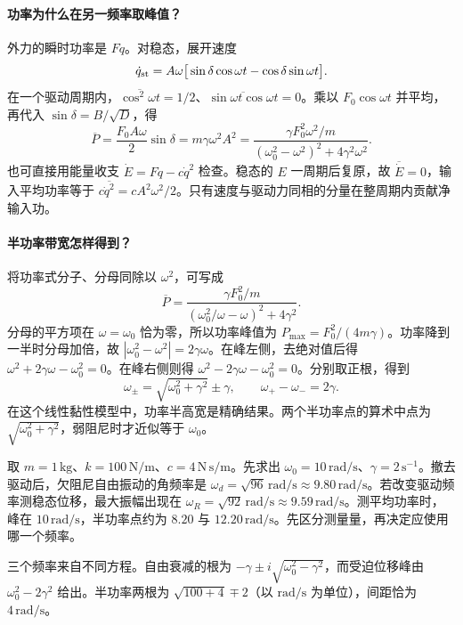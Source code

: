 \paragraph{功率为什么在另一频率取峰值？}
外力的瞬时功率是 $F\dot q$。对稳态，展开速度
\[
\dot q_{\rm st}=A\omega\big[\sin\delta\cos\omega t-\cos\delta\sin\omega t\big].
\]
在一个驱动周期内，$\overline{\cos^2\omega t}=1/2$、$\overline{\sin\omega t\cos\omega t}=0$。乘以 $F_0\cos\omega t$ 并平均，再代入 $\sin\delta=B/\sqrt D$，得
\begin{equation}
\overline P=\frac{F_0A\omega}{2}\sin\delta
=m\gamma\omega^2A^2
=\frac{\gamma F_0^2\omega^2/m}{(\omega_0^2-\omega^2)^2+4\gamma^2\omega^2}.
\label{eq:osc-power}
\end{equation}
也可直接用能量收支 $\dot E=F\dot q-c\dot q^2$ 检查。稳态的 $E$ 一周期后复原，故 $\overline{\dot E}=0$，输入平均功率等于 $c\overline{\dot q^2}=cA^2\omega^2/2$。只有速度与驱动力同相的分量在整周期内贡献净输入功。

\paragraph{半功率带宽怎样得到？}
将功率式分子、分母同除以 $\omega^2$，可写成
\[
\overline P=\frac{\gamma F_0^2/m}
 {(\omega_0^2/\omega-\omega)^2+4\gamma^2}.
\]
分母的平方项在 $\omega=\omega_0$ 恰为零，所以功率峰值为 $P_{\max}=F_0^2/(4m\gamma)$。功率降到一半时分母加倍，故 $|\omega_0^2-\omega^2|=2\gamma\omega$。在峰左侧，去绝对值后得 $\omega^2+2\gamma\omega-\omega_0^2=0$。在峰右侧则得 $\omega^2-2\gamma\omega-\omega_0^2=0$。分别取正根，得到
\[
\omega_\pm=\sqrt{\omega_0^2+\gamma^2}\pm\gamma,\qquad
\omega_+-\omega_-=2\gamma .
\]
在这个线性黏性模型中，功率半高宽是精确结果。两个半功率点的算术中点为 $\sqrt{\omega_0^2+\gamma^2}$，弱阻尼时才近似等于 $\omega_0$。

\begin{example}[同一个振子中的三种频率]
取 $m=1\,\mathrm{kg}$、$k=100\,\mathrm{N/m}$、$c=4\,\mathrm{N\,s/m}$。先求出 $\omega_0=10\,\mathrm{rad/s}$、$\gamma=2\,\mathrm{s^{-1}}$。撤去驱动后，欠阻尼自由振动的角频率是 $\omega_d=\sqrt{96}\,\mathrm{rad/s}\approx9.80\,\mathrm{rad/s}$。若改变驱动频率测稳态位移，最大振幅出现在 $\omega_R=\sqrt{92}\,\mathrm{rad/s}\approx9.59\,\mathrm{rad/s}$。测平均功率时，峰在 $10\,\mathrm{rad/s}$，半功率点约为 $8.20$ 与 $12.20\,\mathrm{rad/s}$。先区分测量量，再决定应使用哪一个频率。

三个频率来自不同方程。自由衰减的根为 $-\gamma\pm i\sqrt{\omega_0^2-\gamma^2}$，而受迫位移峰由 $\omega_0^2-2\gamma^2$ 给出。半功率两根为 $\sqrt{100+4}\mp2$（以 $\mathrm{rad/s}$ 为单位），间距恰为 $4\,\mathrm{rad/s}$。
\end{example}

